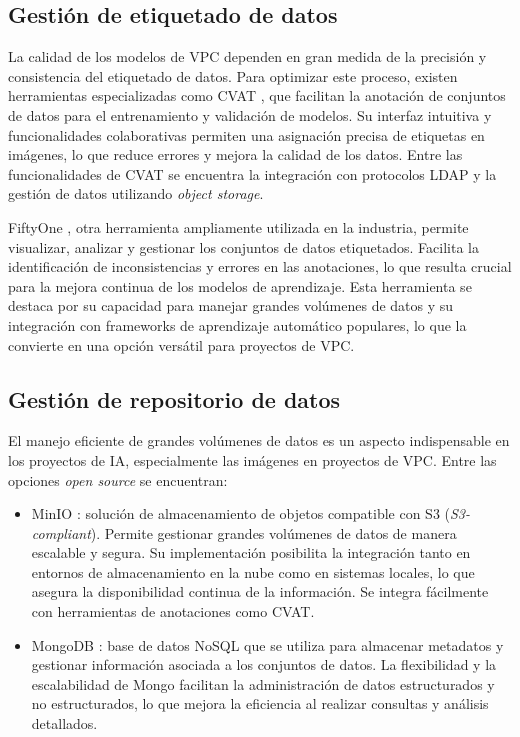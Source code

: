 \subsection{Gestión de etiquetado de datos}

La calidad de los modelos de VPC dependen en gran medida de la precisión y consistencia del etiquetado de datos. Para optimizar este proceso, existen herramientas especializadas como CVAT \citep{sekachev_opencvcvat_2020}, que facilitan la anotación de conjuntos de datos para el entrenamiento y validación de modelos. Su interfaz intuitiva y funcionalidades colaborativas permiten una asignación precisa de etiquetas en imágenes, lo que reduce errores y mejora la calidad de los datos. Entre las funcionalidades de CVAT se encuentra la integración con protocolos LDAP y la gestión de datos utilizando \textit{object storage}.

FiftyOne \citep{moore_fiftyone_2020}, otra herramienta ampliamente utilizada en la industria, permite visualizar, analizar y gestionar los conjuntos de datos etiquetados. Facilita la identificación de inconsistencias y errores en las anotaciones, lo que resulta crucial para la mejora continua de los modelos de aprendizaje. Esta herramienta se destaca por su capacidad para manejar grandes volúmenes de datos y su integración con frameworks de aprendizaje automático populares, lo que la convierte en una opción versátil para proyectos de VPC.

\subsection{Gestión de repositorio de datos}
\label{sec:gestionRepoDatos}

El manejo eficiente de grandes volúmenes de datos es un aspecto indispensable en los proyectos de IA, especialmente las imágenes en proyectos de VPC. Entre las opciones \textit{open source} se encuentran:

\begin{itemize}
	\item MinIO \citep{minio_inc_minio_2023}: solución de almacenamiento de objetos compatible con S3 \citep{amazon_amazon_2024} (\textit{S3-compliant}). Permite gestionar grandes volúmenes de datos de manera escalable y segura. Su implementación posibilita la integración tanto en entornos de almacenamiento en la nube como en sistemas locales, lo que asegura la disponibilidad continua de la información. Se integra fácilmente con herramientas de anotaciones como CVAT.
	\item MongoDB \citep{mongodb_inc_mongodb_2023}: base de datos NoSQL que se utiliza para almacenar metadatos y gestionar información asociada a los conjuntos de datos. La flexibilidad y la escalabilidad de Mongo facilitan la administración de datos estructurados y no estructurados, lo que mejora la eficiencia al realizar consultas y análisis detallados.
\end{itemize}

